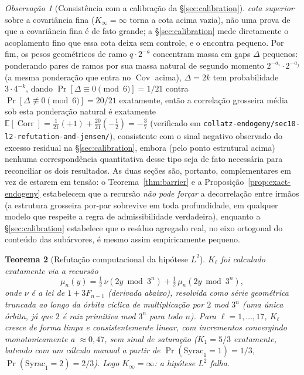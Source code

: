 \documentclass[11pt]{article}
\newtheorem{theorem}{Teorema}[section]
\theoremstyle{definition}
\theoremstyle{remark}
\newtheorem{remark}[theorem]{Observação}
\DeclareMathOperator{\Cov}{Cov}
\DeclareMathOperator{\Corr}{Corr}
\begin{document}
\begin{remark}[Consistência com a calibração da \S\ref{sec:calibration}]
\emph{cota superior} sobre a covariância fina ($K_\infty=\infty$ torna
a cota acima vazia), não uma prova de que a covariância fina é de fato
grande; a \S\ref{sec:calibration} mede diretamente o acoplamento fino
que essa cota deixa sem controle, e o encontra pequeno. Por fim, os
pesos geométricos de ramo $q\cdot 2^{-a}$ concentram massa em gaps
$\Delta$ pequenos: ponderando pares de ramos por sua massa natural de
segundo momento $2^{-a_i}\cdot2^{-a_j}$ (a mesma ponderação que entra
no $\Cov$ acima), $\Delta=2k$ tem probabilidade $3\cdot4^{-k}$, dando
$\Pr[\Delta\equiv0\!\!\pmod6]=1/21$ contra
$\Pr[\Delta\not\equiv0\!\!\pmod6]=20/21$ exatamente, então a
correlação grosseira média sob esta ponderação natural é exatamente
$\mathbb{E}[\Corr]=\tfrac{1}{21}(+1)+\tfrac{20}{21}(-\tfrac12)=-\tfrac37$
(verificado em \texttt{collatz-endogeny/\allowbreak sec10-l2-refutation-and-jensen/}),
consistente com o sinal negativo observado do excesso residual na
\S\ref{sec:calibration}, embora (pelo ponto estrutural acima) nenhuma
correspondência quantitativa desse tipo seja de fato necessária para
reconciliar os dois resultados. As duas seções são, portanto,
complementares em vez de estarem em tensão: o Teorema~\ref{thm:barrier}
e a Proposição~\ref{prop:exact-endogeny} estabelecem que a recursão
\emph{não pode forçar} a decorrelação entre irmãos (a estrutura
grosseira por-par sobrevive em toda profundidade, em qualquer modelo
que respeite a regra de admissibilidade verdadeira), enquanto a
\S\ref{sec:calibration} estabelece que o resíduo agregado real, no
eixo ortogonal do conteúdo das subárvores, é mesmo assim
empiricamente pequeno.
\end{remark}

\begin{theorem}[Refutação computacional da hipótese $L^2$]
\label{thm:l2-refutation}
$K_\ell$ foi calculado exatamente via a recursão
\begin{equation}\label{eq:mu-recursion}
  \mu_n(y) = \tfrac12\,\nu(2y\bmod 3^n) + \tfrac12\,\mu_n(2y\bmod 3^n),
\end{equation}
onde $\nu$ é a lei de $1+3F_{n-1}$ (derivada abaixo), resolvida como
série geométrica truncada ao longo da órbita cíclica de multiplicação
por $2$ mod $3^n$ (uma única órbita, já que $2$ é raiz primitiva mod
$3^n$ para todo $n$). Para $\ell=1,\dots,17$, $K_\ell$ cresce de forma
limpa e consistentemente \emph{linear}, com incrementos convergindo
monotonicamente a $\approx 0{,}47$, sem sinal de saturação ($K_1=5/3$
exatamente, batendo com um cálculo manual a partir de
$\Pr(\mathrm{Syrac}_1=1)=1/3$, $\Pr(\mathrm{Syrac}_1=2)=2/3$). Logo
$K_\infty=\infty$: a hipótese $L^2$ falha.
\end{theorem}
\end{document}
